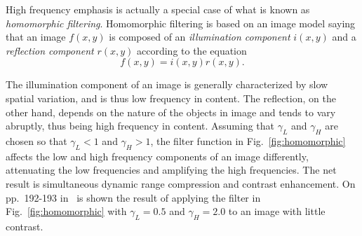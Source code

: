 High frequency emphasis is actually a special case of what is known as
{\em homomorphic filtering\/}.  Homomorphic filtering is based on an
image model saying that an image $f(x,y)$ is composed of an
{\em illumination component\/} $i(x,y)$ and a {\em reflection
  component\/} $r(x,y)$ according to the equation
\begin{equation}
  f(x,y)=i(x,y)r(x,y)\mbox{.}
\end{equation}

The illumination component of an image is generally characterized by
slow spatial variation, and is thus low frequency in content.  The
reflection, on the other hand, depends on the nature of the objects in
image and tends to vary abruptly, thus being high frequency in
content.  Assuming that $\gamma_{L}$ and $\gamma_{H}$ are chosen so
that $\gamma_{L}<1$ and $\gamma_{H}>1$, the filter function in
Fig.~\ref{fig:homomorphic} affects the low and high frequency
components of an image differently, attenuating the low frequencies
and amplifying the high frequencies.  The net result is simultaneous
dynamic range compression and contrast enhancement.  On pp.\ 192-193
in~\cite{digpic} is shown the result of applying the filter in
Fig.~\ref{fig:homomorphic} with $\gamma_{L}=0.5$ and $\gamma_{H}=2.0$
to an image with little contrast.

